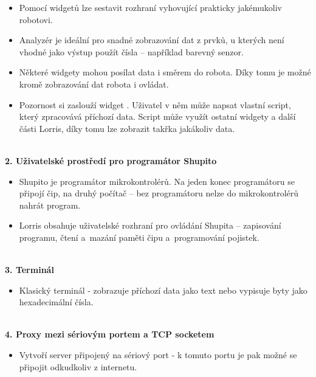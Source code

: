\documentclass[17pt]{extreport}
\newcommand{\B}{\textbf} %
\begin{document}
\vspace{-7mm}
\begin{itemize} 
    \item Pomocí widgetů lze sestavit rozhraní vyhovující prakticky jakémukoliv robotovi.
    \item Analyzér je ideální pro snadné zobrazování dat z prvků, u kterých není vhodné jako výstup použít čísla -- například barevný senzor.
    \item Některé widgety mohou posílat data i směrem do robota. Díky tomu je možné kromě zobrazování dat robota i ovládat.
    \item Pozornost si zaslouží widget . Uživatel v něm může napsat vlastní script, který zpracovává příchozí data. Script může využít ostatní widgety a další části Lorris, díky tomu lze zobrazit takřka jakákoliv data.
\end{itemize}
\\{\large \B{ 2. Uživatelské prostředí pro programátor Shupito }}
\begin{itemize}
    \item Shupito je programátor mikrokontrolérů. Na jeden konec programátoru se připojí čip, na druhý počítač -- bez programátoru nelze do mikrokontrolérů nahrát program.
    \item Lorris obsahuje uživatelské rozhraní pro ovládání Shupita -- zapisování programu, čtení a~mazání paměti čipu a~programování pojistek.
\end{itemize}
\\{\large \B{ 3. Terminál }}
\begin{itemize}
    \item Klasický terminál - zobrazuje příchozí data jako text nebo vypisuje byty jako hexadecimální čísla.
\end{itemize}
\\{\large \B{ 4. Proxy mezi sériovým portem a TCP socketem }}
\begin{itemize}
    \item Vytvoří server připojený na sériový port - k tomuto portu je pak možné se připojit odkudkoliv z internetu.
\end{itemize}
\end{document}
